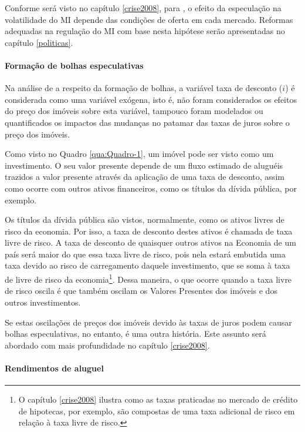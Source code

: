 \documentclass[
	12pt,				%
	oneside,			%
	a4paper,			%
	chapter=TITLE,		%
	section=TITLE,		%
	english,			%
	brazil				%
	]{abntex2}
\begin{document}
\begin{refsection}
Conforme será visto no capítulo \ref{crise2008}, para \textcite[p.~26]{Malpezzi2002TheRO}, o efeito da especulação na volatilidade do \gls{MI} depende das condições
de oferta em cada mercado. Reformas adequadas na regulação do \gls{MI} com base
nesta hipótese serão apresentadas no capítulo \ref{politicas}.

\hypertarget{formauxe7uxe3o-de-bolhas-especulativas}{%
\paragraph{Formação de bolhas especulativas}\label{formauxe7uxe3o-de-bolhas-especulativas}}

Na análise de \textcite{Malpezzi2002TheRO} a respeito da formação de bolhas, a variável
taxa de desconto (\(i\)) é considerada como uma variável exógena, isto é, não
foram considerados os efeitos do preço dos imóveis sobre esta variável, tampouco
foram modelados ou quantificados os impactos das mudanças no patamar das taxas
de juros sobre o preço dos imóveis.

Como visto no Quadro \ref{qua:Quadro-1}, um imóvel pode ser visto como um
investimento. O seu valor presente depende de um fluxo estimado de aluguéis
trazidos a valor presente através da aplicação de uma taxa de desconto, assim
como ocorre com outros ativos financeiros, como os títulos da dívida pública,
por exemplo.

Os títulos da dívida pública são vistos, normalmente, como os ativos livres de
risco da economia. Por isso, a taxa de desconto destes ativos é chamada de taxa
livre de risco. A taxa de desconto de quaisquer outros ativos na Economia de um
país será maior do que essa taxa livre de risco, pois nela estará embutida uma
taxa devido ao risco de carregamento daquele investimento, que se soma à taxa de
livre de risco da economia\footnote{O capítulo \ref{crise2008} ilustra como as taxas praticadas no mercado de
  crédito de hipotecas, por exemplo, são compostas de uma taxa adicional de risco
  em relação à taxa livre de risco.}. Dessa maneira, o que ocorre quando a taxa livre
de risco oscila é que também oscilam os Valores Presentes dos imóveis e dos
outros investimentos.

Se estas oscilações de preços dos imóveis devido às taxas de juros podem causar
bolhas especulativas, no entanto, é uma outra história. Este assunto será
abordado com mais profundidade no capítulo \ref{crise2008}.

\hypertarget{rendimentos-de-aluguel}{%
\paragraph{Rendimentos de aluguel}\label{rendimentos-de-aluguel}}


\end{refsection}
\end{document}
